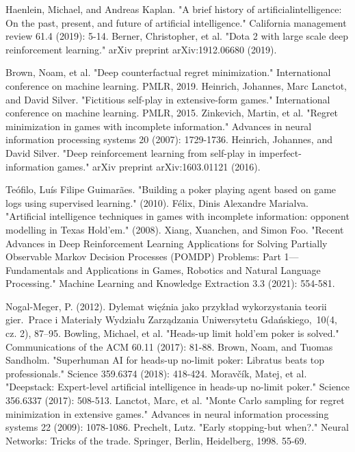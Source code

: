 \documentclass[12pt,oneside,a4paper]{report}
\begin{document}
\begin{thebibliography}{100}
    Haenlein, Michael, and Andreas Kaplan. "A brief history of artificialintelligence: On the past, present, and future of artificial intelligence." California management review 61.4 (2019): 5-14.
    Berner, Christopher, et al. "Dota 2 with large scale deep reinforcement learning." arXiv preprint arXiv:1912.06680 (2019).

    Brown, Noam, et al. "Deep counterfactual regret minimization." International conference on machine learning. PMLR, 2019. 
    Heinrich, Johannes, Marc Lanctot, and David Silver. "Fictitious self-play in extensive-form games." International conference on machine learning. PMLR, 2015.
    Zinkevich, Martin, et al. "Regret minimization in games with incomplete information." Advances in neural information processing systems 20 (2007): 1729-1736.
    Heinrich, Johannes, and David Silver. "Deep reinforcement learning from self-play in imperfect-information games." arXiv preprint arXiv:1603.01121 (2016).

    Teófilo, Luís Filipe Guimarães. "Building a poker playing agent based on game logs using supervised learning." (2010).
    Félix, Dinis Alexandre Marialva. "Artificial intelligence techniques in games with incomplete information: opponent modelling in Texas Hold'em." (2008).
    Xiang, Xuanchen, and Simon Foo. "Recent Advances in Deep Reinforcement Learning Applications for Solving Partially Observable Markov Decision Processes (POMDP) Problems: Part 1—Fundamentals and Applications in Games, Robotics and Natural Language Processing." Machine Learning and Knowledge Extraction 3.3 (2021): 554-581.

     Nogal-Meger, P. (2012). Dylemat więźnia jako przykład wykorzystania teorii gier. Prace i Materiały Wydziału Zarządzania Uniwersytetu Gdańskiego, 10(4, cz. 2), 87–95.
    Bowling, Michael, et al. "Heads-up limit hold'em poker is solved." Communications of the ACM 60.11 (2017): 81-88.
    Brown, Noam, and Tuomas Sandholm. "Superhuman AI for heads-up no-limit poker: Libratus beats top professionals." Science 359.6374 (2018): 418-424.
    Moravčík, Matej, et al. "Deepstack: Expert-level artificial intelligence in heads-up no-limit poker." Science 356.6337 (2017): 508-513. 
    Lanctot, Marc, et al. "Monte Carlo sampling for regret minimization in extensive games." Advances in neural information processing systems 22 (2009): 1078-1086.
    Prechelt, Lutz. "Early stopping-but when?." Neural Networks: Tricks of the trade. Springer, Berlin, Heidelberg, 1998. 55-69.


\end{thebibliography}
\end{document}
